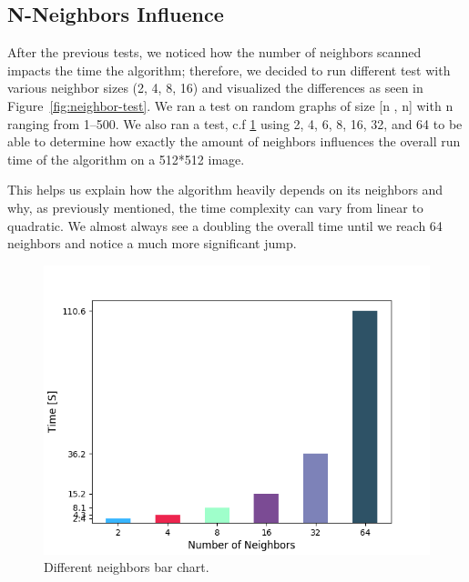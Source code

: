 \documentclass{article}
\begin{document}
\subsection{N-Neighbors Influence}
\begin{flushleft}
After the previous tests, we noticed how the number of neighbors scanned impacts the time the algorithm; therefore, we decided to run different test with various neighbor sizes (2, 4, 8, 16) and visualized the differences as seen in  Figure~\ref{fig:neighbor-test}. We ran a test on random graphs of size [n , n] with n ranging from \numrange[range-phrase = --]{1}{500}. We also ran a test, c.f \ref{fig:neighbor-chartbar} using 2, 4, 6, 8, 16, 32, and 64 to be able to determine how exactly the amount of neighbors influences the overall run time of the algorithm on a 512*512 image.

This helps us explain how the algorithm heavily depends on its neighbors and why, as previously mentioned, the time complexity can vary from linear to quadratic. We almost always see a doubling the overall time until we reach 64 neighbors and notice a much more significant jump.
\end{flushleft}

\begin{figure}[H]
    \centering
    \includegraphics[width=.7\linewidth]{neighbor-chartbar.png}
    \caption{Different neighbors bar chart.}
    \label{fig:neighbor-chartbar}
\end{figure}
\end{document}
